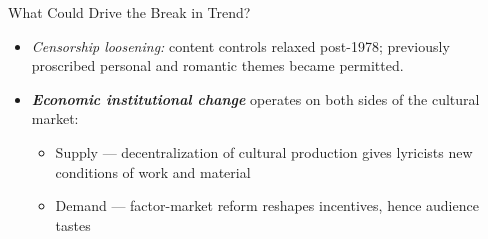 \documentclass[aspectratio=169]{beamer}
\begin{document}
\begin{frame}{What Could Drive the Break in Trend?}

\begin{itemize}\setlength\itemsep{0.6em}
  \item \textit{Censorship loosening:} content controls relaxed post-1978; previously proscribed personal and romantic themes became permitted.
\bigskip
  \item \textbf{\textit{Economic institutional change}} operates on both sides of the cultural market:
  \begin{itemize}\setlength\itemsep{0.3em}
    \item Supply — decentralization of cultural production gives lyricists new conditions of work and material
    \item Demand — factor-market reform reshapes incentives, hence audience tastes
  \end{itemize}
\end{itemize}

\end{frame}
\end{document}
